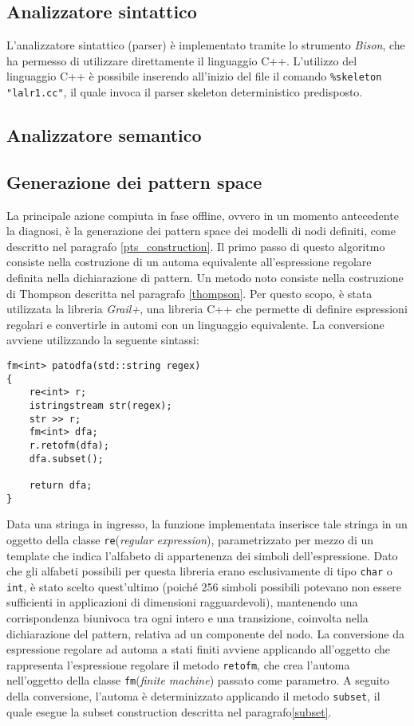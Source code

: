 \subsection{Analizzatore sintattico}
L'analizzatore sintattico (parser) è implementato tramite lo strumento \emph{Bison}, che ha permesso di utilizzare direttamente il linguaggio C++. L'utilizzo del linguaggio C++ è possibile inserendo all'inizio del file il comando \verb|%skeleton "lalr1.cc"|, il quale invoca il parser skeleton deterministico predisposto.




\subsection{Analizzatore semantico}


\subsection{Generazione dei pattern space}
La principale azione compiuta in fase offline, ovvero in un momento antecedente la diagnosi, è la generazione dei pattern space dei modelli di nodi definiti, come descritto nel paragrafo \ref{pts_construction}. 
Il primo passo di questo algoritmo consiste nella costruzione di un automa equivalente all'espressione regolare definita nella dichiarazione di pattern. Un metodo noto consiste nella costruzione di Thompson descritta nel paragrafo \ref{thompson}. 
Per questo scopo, è stata utilizzata la libreria \emph{Grail+}\cite{web:grail}, una libreria C++ che permette di definire espressioni regolari e convertirle in automi con un linguaggio equivalente.
La conversione avviene utilizzando la seguente sintassi:
\begin{verbatim}
fm<int> patodfa(std::string regex)
{
    re<int> r;
    istringstream str(regex);
    str >> r;
    fm<int> dfa;
    r.retofm(dfa);
    dfa.subset();

    return dfa;
}
\end{verbatim}
Data una stringa in ingresso, la funzione implementata inserisce tale stringa in un oggetto della classe \verb|re|(\emph{regular expression}), parametrizzato per mezzo di un template che indica l'alfabeto di appartenenza dei simboli dell'espressione. 
Dato che gli alfabeti possibili per questa libreria erano esclusivamente di tipo \verb|char| o \verb|int|, è stato scelto quest'ultimo (poiché 256 simboli possibili potevano non essere sufficienti in applicazioni di dimensioni ragguardevoli), mantenendo una corrispondenza biunivoca tra ogni intero e una transizione, coinvolta nella dichiarazione del pattern, relativa ad un componente del nodo. La conversione da espressione regolare ad automa a stati finiti avviene applicando all'oggetto che rappresenta l'espressione regolare il metodo \verb|retofm|, che crea l'automa nell'oggetto della classe \verb|fm|(\emph{finite machine}) passato come parametro. A seguito della conversione, l'automa è determinizzato applicando il metodo \verb|subset|, il quale esegue la subset construction descritta nel paragrafo\ref{subset}.

